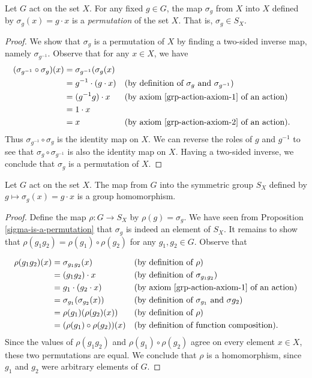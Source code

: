 \begin{prop}\label{sigma-is-a-permutation}
Let $G$ act on the set $X$.  For any fixed $g \in G$, the map $\sigma_g$ from $X$ into $X$ defined by $\sigma_g (x) = g \cdot x$ is a \textit{permutation} of the set $X$.  That is, $\sigma_g \in S_X$.
\end{prop}
\begin{proof}
We show that $\sigma_g$ is a permutation of $X$ by finding a two-sided inverse map, namely $\sigma_{g^{-1}}$. Observe that for any $x \in X$, we have
\begin{align*}
(\sigma_{g^{-1}} \circ \sigma_g) (x) &= \sigma_{g^{-1}} ( \sigma_g (x)  \\
					&= g^{-1} \cdot (g \cdot x) && \text{(by definition of $\sigma_g$ and $\sigma_{g^{-1}}$)} \\
					&= (g^{-1}g) \cdot x &&\text{(by axiom \ref{grp-action-axiom-1} of an action)} \\
					&= 1 \cdot x \\
					&= x &&\text{(by axiom \ref{grp-action-axiom-2} of an action)}.
\end{align*}
Thus $\sigma_{g^{-1}} \circ \sigma_g$ is the identity map on $X$. We can reverse the roles of $g$ and $g^{-1}$ to see that $\sigma_g \circ \sigma_{g^{-1}}$ is also the identity map on $X$.  Having a two-sided inverse, we conclude that $\sigma_g$ is a permutation of $X$.
\end{proof}

\begin{prop}\label{action-yields-hom}
Let $G$ act on the set $X$. The map from $G$ into the symmetric group $S_X$ defined by $g \mapsto \sigma_g (x) = g \cdot x$ is a group homomorphism.
\end{prop}
\begin{proof}
Define the map $\rho \colon G \to S_X$ by $\rho (g) = \sigma_g$.  We have seen from Proposition \ref{sigma-is-a-permutation} that $\sigma_g$ is indeed an element of $S_X$.  It remains to show that $\rho(g_1 g_2) = \rho(g_1) \circ \rho(g_2)$ for any $g_1, g_2 \in G$.  Observe that

\begin{align*}
\rho(g_1 g_2)(x) &= \sigma_{g_1 g_2} (x) && \text{(by definition of $\rho$)} \\
			&= (g_1 g_2) \cdot x && \text{(by definition of $\sigma_{g_1 g_2}$)} \\
			&= g_1 \cdot (g_2 \cdot x) && \text{(by axiom \ref{grp-action-axiom-1} of an action)} \\
			&= \sigma_{g_1} ( \sigma_{g_2} (x)) && \text{(by definition of $\sigma_{g_1}$ and  $\sigma{g_2}$)} \\
			&= \rho(g_1) ( \rho(g_2) (x)) && \text{(by definition of $\rho$)}\\
			&= (\rho(g_1) \circ \rho(g_2)) (x) && \text{(by definition of function composition)}.
\end{align*}
Since the values of $\rho(g_1 g_2)$ and $\rho(g_1) \circ \rho(g_2)$ agree on every element $x \in X$, these two permutations are equal. We conclude that $\rho$ is a homomorphism, since $g_1$ and $g_2$ were arbitrary elements of $G$.
\end{proof}


